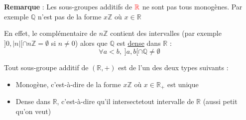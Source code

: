\textbf{Remarque} : Les sous-groupes additifs de $\color{red} \mathbb{R}$ ne sont pas tous monogènes. Par exemple $\mathbb{Q}$ n'est pas de la forme $x \mathbb{Z}$ où $x \in \mathbb{R}$

En effet, le complémentaire de $n \mathbb{Z}$  contient des intervalles (par exemple $]0, |n|[  \cap n \mathbb{Z} = \emptyset$ si $n \ne 0 $) alors que $\mathbb{Q}$ est \underline{dense} dans $\mathbb{R}$ : 
\begin{equation}
  \forall a < b, \; ]a, b[ \cap \mathbb{Q} \ne \emptyset
\end{equation}

\begin{Theorem}{}{}
Tout sous-groupe additif de $(\mathbb{R}, +)$ est de l'un des deux types suivants : 
\begin{itemize}

    \item Monogène, c'est-à-dire de la forme $x \mathbb{Z}$ où $x \in \mathbb{R}_+$ est unique

    \item Dense dans $\mathbb{R}$, c'est-à-dire qu'il intersectetout intervalle de $\mathbb{R}$ (aussi petit qu'on veut)
\end{itemize}
\end{Theorem}

